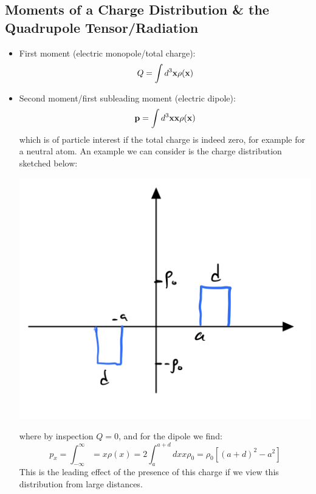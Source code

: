 \subsection{Moments of a Charge Distribution \& the Quadrupole Tensor/Radiation}
\begin{itemize}
    \item First moment (electric monopole/total charge):
    \begin{equation}
        Q = \int d^3\mathbf{x}\rho(\mathbf{x})
    \end{equation}
    \item Second moment/first subleading moment (electric dipole):
    \begin{equation}
        \mathbf{p} = \int d^3\mathbf{x}\mathbf{x}\rho(\mathbf{x})
    \end{equation}
    which is of particle interest if the total charge is indeed zero, for example for a neutral atom. An example we can consider is the charge distribution sketched below:
    \begin{center}
        \includegraphics[scale=0.35]{Lectures/Images/lec12-dipoledchargedist.png}
    \end{center}
    where by inspection $Q = 0$, and for the dipole we find:
    \begin{equation}
        p_x = \int_{-\infty}^\infty = x\rho(x) = 2\int_{a}^{a+d}dx x\rho_0 = \rho_0\left[(a + d)^2 - a^2\right]
    \end{equation}
    This is the leading effect of the presence of this charge if we view this distribution from large distances.

\end{itemize}
